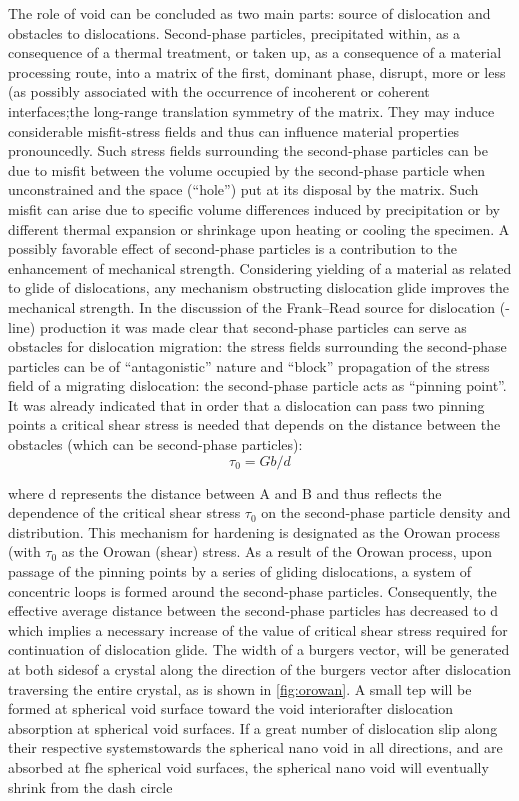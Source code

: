 \documentclass[metals,article,submit,moreauthors,pdftex,10pt,a4paper]{Definitions/mdpi}
\begin{document}
The role of void can be concluded as two main parts: source of dislocation and obstacles to dislocations.  Second-phase particles, precipitated within, as a consequence of a thermal treatment, or taken up, as a consequence of a material processing route, into a matrix of the first, dominant phase, disrupt, more or less (as possibly associated with the occurrence of incoherent or coherent interfaces;the long-range translation symmetry of the matrix. They may induce considerable misfit-stress fields and thus can influence material properties pronouncedly. Such stress fields surrounding the second-phase particles can be due to misfit between the volume occupied by the second-phase particle when unconstrained and the space (“hole”) put at its disposal by the matrix. Such misfit can arise due to specific volume differences induced by precipitation or by different thermal expansion or shrinkage upon heating or cooling the specimen. A possibly favorable effect of second-phase particles is a contribution to the enhancement of mechanical strength. Considering yielding of a material as related to glide of dislocations, any mechanism obstructing dislocation glide improves the mechanical strength. In the discussion of the Frank–Read source for dislocation (-line) production  it was made clear that second-phase particles can serve as obstacles for dislocation migration: the stress fields surrounding the second-phase particles can be of “antagonistic” nature and “block” propagation of the stress field of a migrating dislocation: the second-phase particle acts as “pinning point”. It was already indicated that in order that a dislocation can pass two pinning points a critical shear stress is needed that depends on the distance between the obstacles (which can be second-phase particles):
\begin{equation} \label{eq:orowan} 
\tau_0 = Gb/d
\end{equation}

where d represents the distance between A and B and thus reflects the dependence of the critical shear stress $\tau_0$ on the second-phase particle density and distribution. This mechanism for hardening is designated as the Orowan process (with $\tau_0$ as the Orowan (shear) stress. As a result of the Orowan process, upon passage of the pinning points by a series of gliding dislocations, a system of concentric loops is formed around the second-phase particles. Consequently, the effective average distance between the second-phase particles has decreased to d which implies a necessary increase of the value of critical shear stress required for continuation of dislocation glide. The width of a burgers vector, will be generated at both sidesof a crystal along the direction of the burgers vector after dislocation traversing the entire crystal, as is shown in \ref{fig:orowan}. A small tep will be formed at spherical void surface toward the void interiorafter dislocation absorption at spherical void surfaces. If a great number of dislocation slip along their respective systemstowards the spherical nano void in all directions, and are absorbed at fhe spherical void surfaces, the spherical nano void will eventually shrink from the dash circle 
\end{document}
